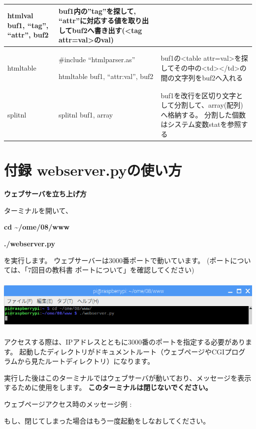 \documentclass[a4paper,12pt,dvipdfmx]{jarticle}
\begin{document}
\begin{center}
\begin{supertabular}{|m{2.349cm}|m{7.57cm}|m{6.487cm}|}
htmlval buf1, “tag”, “attr”, buf2 &
buf1内の”tag”を探して,
“attr”に対応する値を取り出してbuf2へ書き出す({\textless}tag
attr=val{\textgreater}のval)\\\hline
htmltable &
\#include “htmlparser.as”

htmltable buf1, “attr:val”, buf2 &
buf1の{\textless}table
attr=val{\textgreater}を探してその中の{\textless}td{\textgreater}{\textless}/td{\textgreater}の間の文字列をbuf2へ入れる\\\hline
splitnl &
splitnl buf1, array &
buf1を改行を区切り文字として分割して、array(配列)へ格納する。
分割した個数はシステム変数statを参照する\\\hline
\end{supertabular}
\end{center}
\section{付録 webserver.pyの使い方}
{\bfseries
ウェブサーバを立ち上げ方}

ターミナルを開いて、

\textbf{cd \~{}/ome/08/www}

\textbf{./webserver.py}

を実行します。
ウェブサーバーは3000番ポートで動いています。
(ポートについては、「7回目の教科書
ポートについて」を確認してください)%


\begin{center}
\includegraphics[width=17.006cm,height=2.478cm]{textbook-img063.png}

\end{center}
アクセスする際は、IPアドレスとともに3000番のポートを指定する必要があります。
起動したディレクトリがドキュメントルート（ウェブページやCGIプログラムから見たルートディレクトリ）になります。


実行した後はこのターミナルではウェブサーバが動いており、メッセージを表示するために使用をします。
\textbf{このターミナルは閉じないでください。}

ウェブページアクセス時のメッセージ例
: 

もし、閉じてしまった場合はもう一度起動をしなおしてください。
\end{document}
